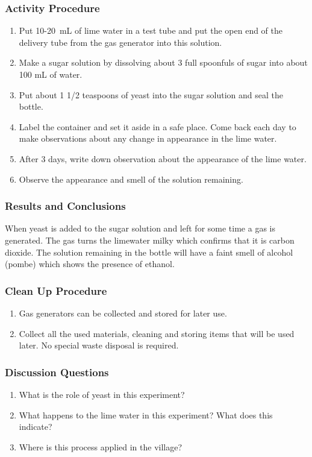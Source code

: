 \subsubsection*{Activity Procedure}
\begin{enumerate}

\item{Put 10-20~mL of lime water in a test tube and put the open end of the delivery tube from the gas generator into this solution.}
\item{Make a sugar solution by dissolving about 3 full spoonfuls of sugar into about 100 mL of water.}
\item{Put about 1 1/2 teaspoons of yeast into the sugar solution and seal the bottle.}
\item{Label the container and set it aside in a safe place. Come back each day to make observations about any change in appearance in the lime water.}
\item{After 3 days, write down observation about the appearance of the lime water.}
\item{Observe the appearance and smell of the solution remaining.}
\end{enumerate}

\subsubsection*{Results and Conclusions}
When yeast is added to the sugar solution and left for some time a gas is generated. The gas turns the limewater milky which confirms that it is carbon dioxide. The solution remaining in the bottle will have a faint smell of alcohol (pombe) which shows the presence of ethanol.

\subsubsection*{Clean Up Procedure}
\begin{enumerate}
\item{Gas generators can be collected and stored for later use.}
\item{Collect all the used materials, cleaning and storing items that will be used later. No special waste disposal is required.}
\end{enumerate}

\subsubsection*{Discussion Questions}
\begin{enumerate}
\item{What is the role of yeast in this experiment?}
\item{What happens to the lime water in this experiment? What does this indicate?}
\item{Where is this process applied in the village?}
\end{enumerate}

